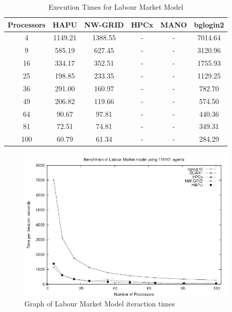 {
\renewcommand{\arraystretch}{1.25}
\begin{table}[ht]
 \centering
  \begin{tabular}{c|ccccc}
 Processors &HAPU  &NW-GRID &HPCx  &MANO   &bglogin2 \\ \hline
 4   &1149.21   &1388.55  &-   &-   &7014.64  \\
 9   &585.19   &627.45   &-   &-   &3120.96  \\
 16   &334.17   &352.51   &-   &-   &1755.93  \\
 25   &198.85   &233.35   &-   &-   &1129.25   \\
 36   &291.00   &160.97   &-   &-   &782.70   \\
 49   &206.82   &119.66   &-   &-   &574.50   \\
 64   &90.67   &97.81   &-   &-   &440.36   \\
 81   &72.51   &74.81   &-   &-   &349.31   \\
 100   &60.79   &61.34   &-   &-   &284.29   \\
 \end{tabular}
 \caption{Execution Times for Labour Market Model}
 \label{tab:ExecutionTimesForLabour}
\end{table}
}
\bigskip
\begin{figure}[ht]
 \centering
  \includegraphics[width=300pt]{Labour2-graph.jpg}
 \caption{Graph of Labour Market Model iteraction times}
 \label{fig:Labour-graph1}
\end{figure}

